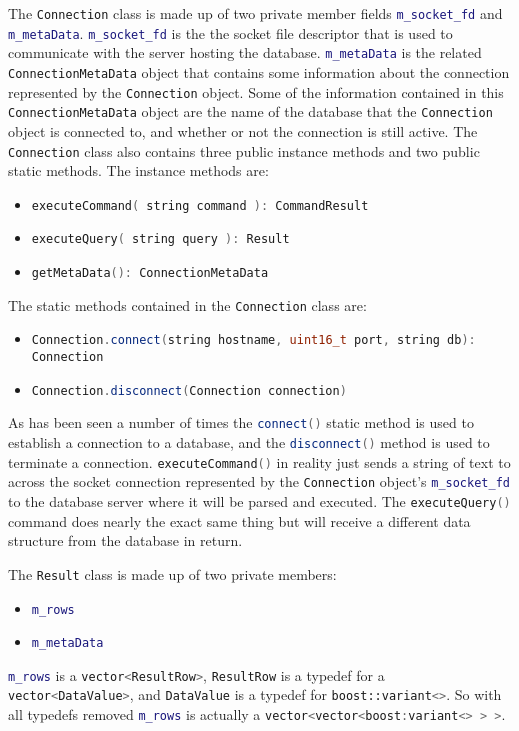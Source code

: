 \documentclass[letterpaper, 11pt]{article}
\newcommand{\inlinecode}[1]{\colorbox{codegrey}{\lstinline[language=C++]{#1}}}
\begin{document}
  \par\vspace{\baselineskip}
  The \inlinecode{Connection} class is made up of two private
  member fields \inlinecode{m_socket_fd} and
  \inlinecode{m_metaData}.
  \inlinecode{m_socket_fd} is the the socket file descriptor that is
  used to communicate with the server hosting the database.
  \inlinecode{m_metaData} is the related
  \inlinecode{ConnectionMetaData} object that contains some
  information about the connection represented by the
  \inlinecode{Connection} object. Some of the information contained
  in this \inlinecode{ConnectionMetaData} object are
  the name of the database that the \inlinecode{Connection} object
  is connected to, and whether or not the connection is still active. The
  \inlinecode{Connection} class also contains three public
  instance methods and two public static methods. The instance methods are:
  \begin{itemize}
    \item \inlinecode{executeCommand( string command ): CommandResult}
    \item \inlinecode{executeQuery( string query ): Result}
    \item \inlinecode{getMetaData(): ConnectionMetaData}
  \end{itemize}
  The static methods contained in the \inlinecode{Connection} class
  are:
  \begin{itemize}
  	\item \inlinecode{Connection.connect(string hostname, uint16_t port, string db): Connection}
  	\item \inlinecode{Connection.disconnect(Connection connection)}
  \end{itemize}
  As has been seen a number of times the \inlinecode{connect()}
  static method is used  to establish a connection to a database, and the
  \inlinecode{disconnect()} method is used to terminate a connection.
  \inlinecode{executeCommand()} in reality just sends a string of
  text to across the socket connection represented by the
  \inlinecode{Connection} object's
  \inlinecode{m_socket_fd} to the database server where it will be
  parsed and executed. The \inlinecode{executeQuery()} command
  does nearly the exact same thing but will receive a different data structure from the
  database in return.
  \par\vspace{\baselineskip}

  The \inlinecode{Result} class is made up of two private members:
  \begin{itemize}
    \item \inlinecode{m_rows}
    \item \inlinecode{m_metaData}
  \end{itemize}
  \inlinecode{m_rows} is a \inlinecode{vector<ResultRow>}, \inlinecode{ResultRow} is a typedef for
  a  \\ \inlinecode{vector<DataValue>}, and \inlinecode{DataValue} is a typedef for \inlinecode{boost::variant<>}.
  So with all typedefs removed \inlinecode{m_rows} is actually a \inlinecode{vector<vector<boost:variant<> > >}.
\end{document}
